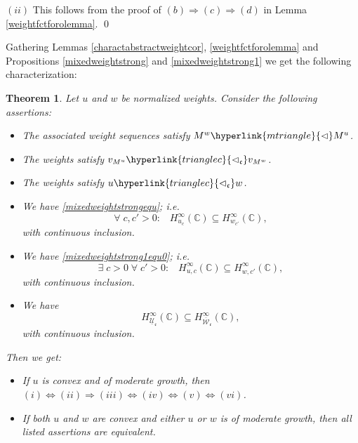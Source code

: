 \documentclass[10pt]{amsart}%
\numberwithin{equation}{section}
\theoremstyle{plain}
\newtheorem{theorem}[proposition]{Theorem}
\newcommand{\CC}{\mathbb{C}}
\begin{document}
$(ii)$ This follows from the proof of $(b)\Rightarrow(c)\Rightarrow(d)$ in Lemma \ref{weightfctforolemma}.
\qed\enddemo

Gathering Lemmas \ref{charactabstractweightcor}, \ref{weightfctforolemma} and Propositions \ref{mixedweightstrong} and \ref{mixedweightstrong1} we get the following characterization:

\begin{theorem}\label{littleoweightfctcharact}
	Let $u$ and $w$ be normalized weights. Consider the following assertions:
	\begin{itemize}
		\item[$(i)$] The associated weight sequences satisfy $M^{w}\hyperlink{mtriangle}{\vartriangleleft}M^{u}$.
		
		\item[$(ii)$] The weights satisfy $v_{M^u}\hyperlink{trianglec}{\vartriangleleft_{\mathfrak{c}}}v_{M^w}$.
		
		\item[$(iii)$] The weights satisfy $u\hyperlink{trianglec}{\vartriangleleft_{\mathfrak{c}}}w$.
		
		\item[$(iv)$] We have \eqref{mixedweightstrongequ}; i.e.
		$$\forall\;c,c'>0:\;\;\;H^{\infty}_{u_c}(\CC)\subseteq H^{\infty}_{w_{c'}}(\CC),$$
		with continuous inclusion.
		
		\item[$(v)$] We have \eqref{mixedweightstrong1equ0}; i.e.
		$$\exists\;c>0\;\forall\;c'>0:\;\;\;H^{\infty}_{u,c}(\CC)\subseteq H^{\infty}_{w,c'}(\CC),$$
		with continuous inclusion.
		
		\item[$(vi)$] We have
		$$H^{\infty}_{\underline{\mathcal{U}}_{\mathfrak{c}}}(\CC)\subseteq H^{\infty}_{\overline{\mathcal{W}}_{\mathfrak{c}}}(\CC),$$
		with continuous inclusion.
	\end{itemize}
	Then we get:
	\begin{itemize}
		\item[$(*)$] If $u$ is convex and of moderate growth, then $(i)\Leftrightarrow(ii)\Rightarrow(iii)\Leftrightarrow(iv)\Leftrightarrow(v)\Leftrightarrow(vi)$.
		
		\item[$(*)$] If both $u$ and $w$ are convex and either $u$ or $w$ is of moderate growth, then all listed assertions are equivalent.
	\end{itemize}
\end{theorem}
\end{document}
